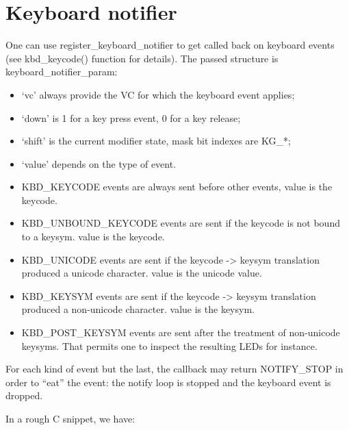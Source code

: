 \documentclass[a4paper,8pt,english]{sphinxmanual}
\begin{document}
\section{Keyboard notifier}
\label{input/notifier::doc}\label{input/notifier:keyboard-notifier}
One can use register\_keyboard\_notifier to get called back on keyboard
events (see kbd\_keycode() function for details).  The passed structure is
keyboard\_notifier\_param:
\begin{itemize}
\item {} 
`vc' always provide the VC for which the keyboard event applies;

\item {} 
`down' is 1 for a key press event, 0 for a key release;

\item {} 
`shift' is the current modifier state, mask bit indexes are KG\_*;

\item {} 
`value' depends on the type of event.

\item {} 
KBD\_KEYCODE events are always sent before other events, value is the keycode.

\item {} 
KBD\_UNBOUND\_KEYCODE events are sent if the keycode is not bound to a keysym.
value is the keycode.

\item {} 
KBD\_UNICODE events are sent if the keycode -\textgreater{} keysym translation produced a
unicode character. value is the unicode value.

\item {} 
KBD\_KEYSYM events are sent if the keycode -\textgreater{} keysym translation produced a
non-unicode character. value is the keysym.

\item {} 
KBD\_POST\_KEYSYM events are sent after the treatment of non-unicode keysyms.
That permits one to inspect the resulting LEDs for instance.

\end{itemize}

For each kind of event but the last, the callback may return NOTIFY\_STOP in
order to ``eat'' the event: the notify loop is stopped and the keyboard event is
dropped.

In a rough C snippet, we have:
\end{document}
